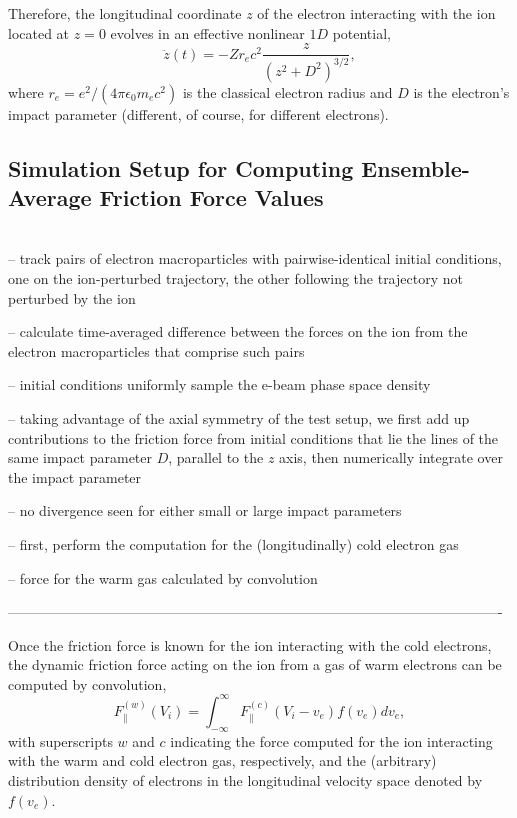 \documentclass[12pt, reqno]{amsart}
\begin{document}
Therefore, the longitudinal coordinate $z$ of the electron interacting with the ion located at $z=0$ evolves in an effective nonlinear $1D$ potential, 
\begin{equation}
\ddot{z}(t) = - Zr_ec^2 \frac{z}{(z^2 +D^2)^{3/2}} ,
\end{equation}
where $r_e = e^2/(4 \pi \epsilon_0 m_e c^2)$ is the classical electron radius and $D$ is the electron's impact parameter (different, of course, for different electrons).

\subsection{Simulation Setup for Computing Ensemble-Average Friction Force Values} 
~\\
-- track pairs of electron macroparticles with pairwise-identical initial conditions, one on the ion-perturbed trajectory, the other following the trajectory not  perturbed by the ion 

-- calculate time-averaged difference between the forces on the ion from the electron macroparticles that comprise such pairs 

-- initial conditions uniformly sample the e-beam phase space density 

-- taking advantage of the axial symmetry of the test setup, we first add up contributions to the friction force from initial conditions that lie the lines of the same impact parameter $D$, parallel to the $z$ axis, then numerically integrate over the impact parameter  

-- no divergence seen for either small or large impact parameters 


-- first, perform the computation for the (longitudinally) cold electron gas 

-- force for the warm gas calculated by convolution 

---------------------------------------------------------------------------------------------------------- 


Once the friction force is known for the ion interacting with the cold electrons, the dynamic friction force acting on the ion from a gas of warm electrons can be computed by convolution, 
\begin{equation}
F^{(w)}_{\parallel}(V_i) = \int_{-\infty}^{\infty}  F^{(c)}_{\parallel}(V_i -v_e) f(v_e) dv_e ,
\end{equation}
with superscripts $w$ and $c$ indicating the force computed for the ion interacting with the warm and cold electron gas, respectively, and the (arbitrary) distribution density of electrons in the longitudinal velocity space denoted by $f(v_e)$. 
\end{document}

